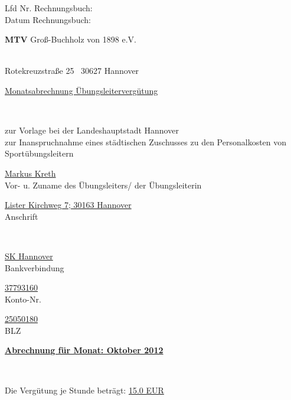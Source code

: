 \documentclass[a4paper,10pt,BCOR=0mm]{scrreprt}
\begin{document}
\begin{flushright}
\parbox{6cm}{Lfd Nr. Rechnungsbuch: \hrulefill \\
Datum Rechnungsbuch: \hrulefill }
\end{flushright}
\begin{center}
\begin{Large}\textbf{MTV} Groß-Buchholz von 1898 e.V.                                        \end{Large}\\
Rotekreuzstraße 25 \textperiodcentered\ 30627 Hannover\\[.4cm]
\begin{huge}\underline{Monatsabrechnung Übungsleitervergütung}\end{huge}\\
\begin{scriptsize}zur Vorlage bei der Landeshauptstadt Hannover\\
zur Inanspruchnahme eines städtischen Zuschusses zu den Personalkosten von Sportübungsleitern\\[.7cm]
\end{scriptsize}

\parbox{0,49\textwidth}{
\begin{center}
\hrulefill\underline{Markus Kreth}\hrulefill\\
Vor- u. Zuname des Übungsleiters/ der Übungsleiterin
\end{center}
}
\hfill
\parbox{0,49\textwidth}{\begin{center}
\hrulefill\underline{Lister Kirchweg 7; 30163 Hannover}\hrulefill\\
Anschrift\end{center}}\\[.7cm]
\parbox{0,32\textwidth}{
\begin{center}
\hrulefill\underline{SK Hannover}\hrulefill\\
Bankverbindung
\end{center}
}
\hfill
\parbox{0,32\textwidth}{
\begin{center}
\hrulefill\underline{37793160}\hrulefill\\
Konto-Nr.
\end{center}
}
\hfill
\parbox{0,32\textwidth}{
\begin{center}
\hrulefill\underline{25050180}\hrulefill\\
BLZ
\end{center}
}
\parbox{12cm}{\begin{large}\underline{\textbf{Abrechnung für Monat: Oktober 2012}}\end{large}}\\
\parbox{9cm}{Die Vergütung je Stunde beträgt: \underline{15.0 EUR}}
\end{center}\begin{flushright}


\end{flushright}
\end{document}
